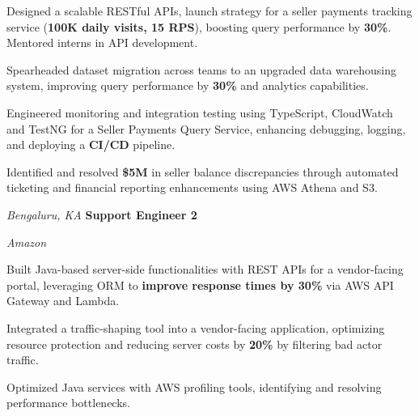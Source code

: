 \begin{onecolentry}
    \begin{highlights}
        \item Designed a scalable RESTful APIs, launch strategy for a seller payments tracking service (\textbf{100K daily visits, 15 RPS}), boosting query performance by \textbf{30\%}. Mentored interns in API development.
        \item Spearheaded dataset migration across teams to an upgraded data warehousing system, improving query performance by \textbf{30\%} and analytics capabilities.
        \item Engineered monitoring and integration testing using TypeScript, CloudWatch and TestNG for a Seller Payments Query Service, enhancing debugging, logging, and deploying a \textbf{CI/CD} pipeline.
        \item Identified and resolved \textbf{\$5M} in seller balance discrepancies through automated ticketing and financial reporting enhancements using AWS Athena and S3.
    \end{highlights}
\end{onecolentry}

\vspace{0.15 cm}

\begin{twocolentry}{
    \textit{Bengaluru, KA}}
    \textbf{Support Engineer 2}
    
    \textit{Amazon}
\end{twocolentry}

\vspace{0.15 cm}

\begin{onecolentry}
    \begin{highlights}
        \item Built Java-based server-side functionalities with REST APIs for a vendor-facing portal, leveraging ORM to \textbf{improve response times by 30\%} via AWS API Gateway and Lambda.
        \item Integrated a traffic-shaping tool into a vendor-facing application, optimizing resource protection and reducing server costs by \textbf{20\%} by filtering bad actor traffic.
        \item Optimized Java services with AWS profiling tools, identifying and resolving performance bottlenecks.
    \end{highlights}
\end{onecolentry}
